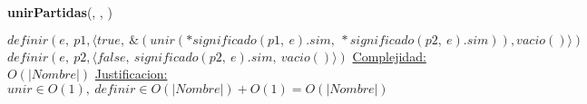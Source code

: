 \begin{Algoritmos}
    \begin{algorithm}[H]{\textbf{unirPartidas}(, , )}
        \begin{algorithmic}[1]
            \State $definir(e,\ p1, \langle true,\ \&(unir(*significado(p1,\ e).sim,\ *significado(p2,\ e).sim)), vacio()\rangle)$
            \State $definir(e,\ p2, \langle false,\ significado(p2,\ e).sim,\ vacio() \rangle)$
            \medskip
            \Statex \underline{Complejidad:} $O(|Nombre|)$
            \Statex \underline{Justificacion:} $unir \in O(1),\ definir \in O(|Nombre|) + O(1) = O(|Nombre|)$
        \end{algorithmic}
    \end{algorithm}    




\end{Algoritmos}
